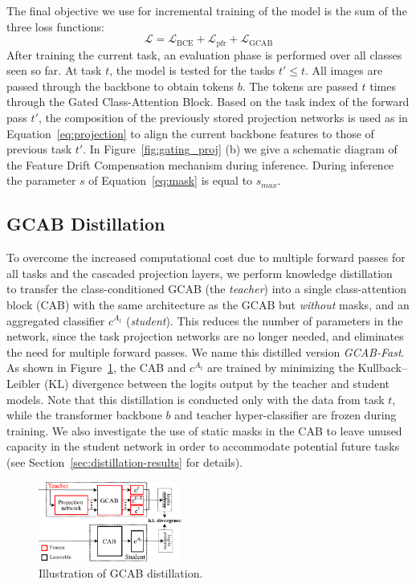 \documentclass[twocolumn]{svjour3}          %
\begin{document}
The final objective we use for incremental training of the model is the sum of the three loss functions:
\begin{equation}
    \mathcal{L} = \mathcal{L}_{\text{BCE}} + \mathcal{L}_{\text{pfr}} +  \mathcal{L}_{\text{GCAB}} 
\end{equation}
After training the current task, an evaluation phase is performed over all classes seen so far.  At task $t$, the model is tested for the tasks $t' \leq t$. All images are passed through the backbone to obtain tokens $b$. The tokens are passed $t$ times through the Gated Class-Attention Block. Based on the task index of the forward pass $t'$, the composition of the previously stored projection networks is used as in Equation~\ref{eq:projection} to align the current backbone features to those of previous task $t'$. In Figure~\ref{fig:gating_proj} (b) we give a schematic diagram of the Feature Drift Compensation mechanism during inference. During inference the parameter $s$ of Equation~\ref{eq:mask} is equal to $s_{max}$.



\subsection{GCAB Distillation}
\label{sec:distillation}
To overcome the increased computational cost due to multiple forward passes for all tasks and the cascaded projection layers, we perform knowledge distillation~\citep{hinton2015distilling} to transfer the class-conditioned GCAB (the \emph{teacher})
into a single class-attention block (CAB) with the same architecture as the GCAB but \emph{without} masks, and an aggregated classifier $c^{A_{t}}$ (\emph{student}). 
{This reduces the number of parameters in the network, since the task projection networks are no longer needed, and eliminates the need for multiple forward passes. We name this distilled version  \emph{GCAB-Fast}}.
As shown in Figure~\ref{fig:distill}, the CAB and $c^{A_{t}}$ are trained by minimizing the Kullback–Leibler (KL) divergence  between the logits output by the teacher and student models. Note that this distillation is conducted only with the data from task $t$, while the transformer backbone $b$ and teacher hyper-classifier are frozen during training. We also investigate the use of static masks in the CAB to leave unused capacity in the student network in order to accommodate potential future tasks (see Section~\ref{sec:distillation-results} for details). 

\begin{figure}
    \centering
    \includegraphics[width=0.42\textwidth]{images/CAB_dis.pdf}
    \caption{Illustration of GCAB distillation.}
    \vspace{-0.2cm}
    \label{fig:distill}
\end{figure}
\end{document}
